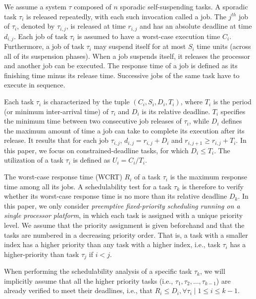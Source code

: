 
We assume a system $\tau$ composed of $n$ sporadic self-suspending tasks. A sporadic task $\tau_i$ is released repeatedly, with each such invocation called a
job. The $j^{th}$ job of $\tau_i$, denoted by $\tau_{i,j}$, is released
at time $r_{i,j}$ and has an absolute deadline at time $d_{i,j}$. Each
job of task $\tau_i$ is assumed to have a worst-case execution time $C_i$. Furthermore, a job of task $\tau_i$ may suspend itself for at most $S_i$ time units (across all of its suspension phases). When a job suspends itself, it releases the processor and another job can be executed. The response time of a job is defined as its finishing time minus its release
time. Successive jobs of the same task have to execute in
sequence. 

Each task $\tau_i$ is characterized by the tuple $(C_i, S_i, D_i, T_i)$, where $T_i$ is the period (or minimum inter-arrival time) of $\tau_i$ and $D_i$ is its relative deadline. $T_i$ specifies the minimum time between two consecutive job releases of
$\tau_i$, while $D_i$ defines the maximum
amount of time a job can take to complete its execution after its
release. It results that for each job $\tau_{i,j}$, $d_{i,j}=r_{i,j}+D_i$ and $r_{i,j+1} \geq r_{i,j} + T_i$. In this paper, we focus on constrained-deadline tasks, for which
$D_i \leq T_i$. The utilization of a task $\tau_i$ is defined as $U_i=C_i/T_i$. 

The worst-case response time (WCRT) $R_i$ of a task $\tau_i$ is the maximum response time among all its
jobs. A schedulability test for a task $\tau_k$
is therefore to verify whether its worst-case response time is no more than its relative deadline $D_k$.
In this paper, we only consider \emph{preemptive fixed-priority scheduling running on a single processor platform}, in
which each task is assigned with a unique priority level. We assume
that the priority assignment is given beforehand and that the tasks are numbered in a decreasing priority order. That is, a task with a smaller index has a higher priority than any task with a higher index, i.e., task $\tau_i$ has a higher-priority than task $\tau_{j}$ if $i < j$. 

When performing the schedulability analysis of a specific task $\tau_k$, we will implicitly assume that all the higher priority tasks (i.e., $\tau_1, \tau_2, \ldots, \tau_{k-1}$) are already verified to meet their deadlines, i.e., that $R_i \leq D_i, \forall \tau_i \mid 1 \leq i \leq k-1$. 




